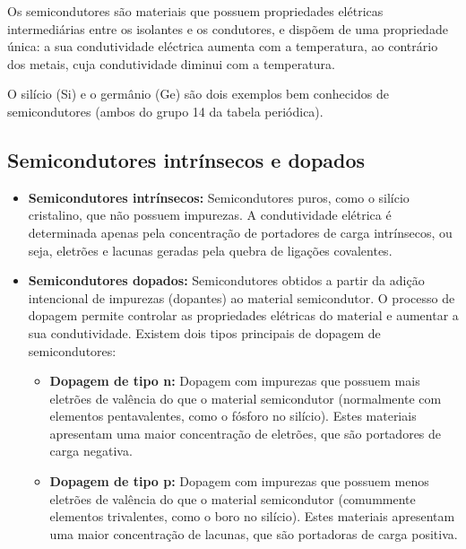 
Os semicondutores são materiais que possuem propriedades elétricas intermediárias entre os isolantes e os condutores, e dispõem de uma propriedade única: a sua condutividade eléctrica aumenta com a temperatura, ao contrário dos metais, cuja condutividade diminui com a temperatura. 

O silício (Si) e o germânio (Ge) são dois exemplos bem conhecidos de semicondutores (ambos do grupo 14 da tabela periódica).

\subsection[1.1 Semicondutores intrínsecos e dopados]{\hspace*{0.075 em}\raisebox{0.2 em}{$\pmb{\drsh}$} Semicondutores intrínsecos e dopados}
\label{subsec:semiconductors-intrinsic-and-doped}

\begin{itemize}
    \item \textbf{Semicondutores intrínsecos:} Semicondutores puros, como o silício cristalino, que não possuem impurezas. A condutividade elétrica é determinada apenas pela concentração de portadores de carga intrínsecos, ou seja, eletrões e lacunas geradas pela quebra de ligações covalentes.
    
    \item \textbf{Semicondutores dopados:} Semicondutores obtidos a partir da adição intencional de impurezas (dopantes) ao material semicondutor. O processo de dopagem permite controlar as propriedades elétricas do material e aumentar a sua condutividade. Existem dois tipos principais de dopagem de semicondutores:
    \begin{itemize}[label=$\blacktriangle$]
        \item \textbf{Dopagem de tipo n:} Dopagem com impurezas que possuem mais eletrões de valência do que o material semicondutor (normalmente com elementos pentavalentes, como o fósforo no silício). Estes materiais apresentam uma maior concentração de eletrões, que são portadores de carga negativa.
        
        \item \textbf{Dopagem de tipo p:} Dopagem com impurezas que possuem menos eletrões de valência do que o material semicondutor (comummente elementos trivalentes, como o boro no silício). Estes materiais apresentam uma maior concentração de lacunas, que são portadoras de carga positiva.
    \end{itemize}
\end{itemize}

